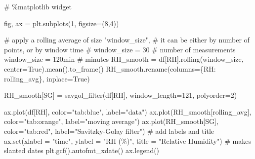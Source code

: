 \documentclass[
  letterpaper,
  DIV=11,
  numbers=noendperiod,
  oneside]{scrreprt}
\newenvironment{Shaded}{\begin{snugshade}}{\end{snugshade}}
\newcommand{\BuiltInTok}[1]{\textcolor[rgb]{0.00,0.23,0.31}{#1}}
\newcommand{\CommentTok}[1]{\textcolor[rgb]{0.37,0.37,0.37}{#1}}
\newcommand{\DecValTok}[1]{\textcolor[rgb]{0.68,0.00,0.00}{#1}}
\newcommand{\NormalTok}[1]{\textcolor[rgb]{0.00,0.23,0.31}{#1}}
\newcommand{\OperatorTok}[1]{\textcolor[rgb]{0.37,0.37,0.37}{#1}}
\newcommand{\StringTok}[1]{\textcolor[rgb]{0.13,0.47,0.30}{#1}}
\newcommand{\VariableTok}[1]{\textcolor[rgb]{0.07,0.07,0.07}{#1}}
\begin{document}
\begin{Shaded}
\begin{Highlighting}[]
\CommentTok{\# \%matplotlib widget}

\NormalTok{fig, ax }\OperatorTok{=}\NormalTok{ plt.subplots(}\DecValTok{1}\NormalTok{, figsize}\OperatorTok{=}\NormalTok{(}\DecValTok{8}\NormalTok{,}\DecValTok{4}\NormalTok{))}

\CommentTok{\# apply a rolling average of size "window\_size",}
\CommentTok{\# it can be either by number of points, or by window time}
\CommentTok{\# window\_size = 30  \# number of measurements}
\NormalTok{window\_size }\OperatorTok{=} \StringTok{\textquotesingle{}120min\textquotesingle{}}  \CommentTok{\# minutes}
\NormalTok{RH\_smooth }\OperatorTok{=}\NormalTok{ df[}\StringTok{\textquotesingle{}RH\textquotesingle{}}\NormalTok{].rolling(window\_size, center}\OperatorTok{=}\VariableTok{True}\NormalTok{).mean().to\_frame()}
\NormalTok{RH\_smooth.rename(columns}\OperatorTok{=}\NormalTok{\{}\StringTok{\textquotesingle{}RH\textquotesingle{}}\NormalTok{: }\StringTok{\textquotesingle{}rolling\_avg\textquotesingle{}}\NormalTok{\}, inplace}\OperatorTok{=}\VariableTok{True}\NormalTok{)}

\NormalTok{RH\_smooth[}\StringTok{\textquotesingle{}SG\textquotesingle{}}\NormalTok{] }\OperatorTok{=}\NormalTok{ savgol\_filter(df[}\StringTok{\textquotesingle{}RH\textquotesingle{}}\NormalTok{], window\_length}\OperatorTok{=}\DecValTok{121}\NormalTok{, polyorder}\OperatorTok{=}\DecValTok{2}\NormalTok{)}

\NormalTok{ax.plot(df[}\StringTok{\textquotesingle{}RH\textquotesingle{}}\NormalTok{], color}\OperatorTok{=}\StringTok{"tab:blue"}\NormalTok{, label}\OperatorTok{=}\StringTok{"data"}\NormalTok{)}
\NormalTok{ax.plot(RH\_smooth[}\StringTok{\textquotesingle{}rolling\_avg\textquotesingle{}}\NormalTok{], color}\OperatorTok{=}\StringTok{"tab:orange"}\NormalTok{, label}\OperatorTok{=}\StringTok{"moving average"}\NormalTok{)}
\NormalTok{ax.plot(RH\_smooth[}\StringTok{\textquotesingle{}SG\textquotesingle{}}\NormalTok{], color}\OperatorTok{=}\StringTok{"tab:red"}\NormalTok{, label}\OperatorTok{=}\StringTok{"Savitzky{-}Golay filter"}\NormalTok{)}
\CommentTok{\# add labels and title}
\NormalTok{ax.}\BuiltInTok{set}\NormalTok{(xlabel }\OperatorTok{=} \StringTok{"time"}\NormalTok{,}
\NormalTok{       ylabel }\OperatorTok{=} \StringTok{"RH (\%)"}\NormalTok{,}
\NormalTok{       title }\OperatorTok{=} \StringTok{"Relative Humidity"}\NormalTok{)}
\CommentTok{\# makes slanted dates}
\NormalTok{plt.gcf().autofmt\_xdate()}
\NormalTok{ax.legend()}
\end{Highlighting}
\end{Shaded}
\end{document}
